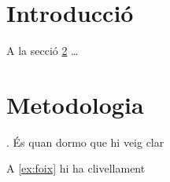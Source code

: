 \documentclass{article}
\begin{document}
\section{Introducció}
\label{sec:intro}

A la secció \ref{sec:metod} \dots

\section{Metodologia}
\label{sec:metod}

\ex. És quan dormo que hi veig clar 
\label{ex:foix}

A \ref{ex:foix} hi ha clivellament
 
\end{document}
